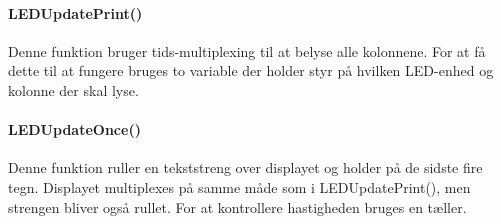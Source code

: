 \paragraph{LEDUpdatePrint()}
Denne funktion bruger tids-multiplexing til at belyse alle kolonnene. For at få dette til at fungere bruges to variable der holder styr på hvilken LED-enhed og kolonne der skal lyse.

\paragraph{LEDUpdateOnce()}
Denne funktion ruller en tekststreng over displayet og holder på de sidste fire tegn. Displayet multiplexes på samme måde som i LEDUpdatePrint(), men strengen bliver også rullet. For at kontrollere hastigheden bruges en tæller.



